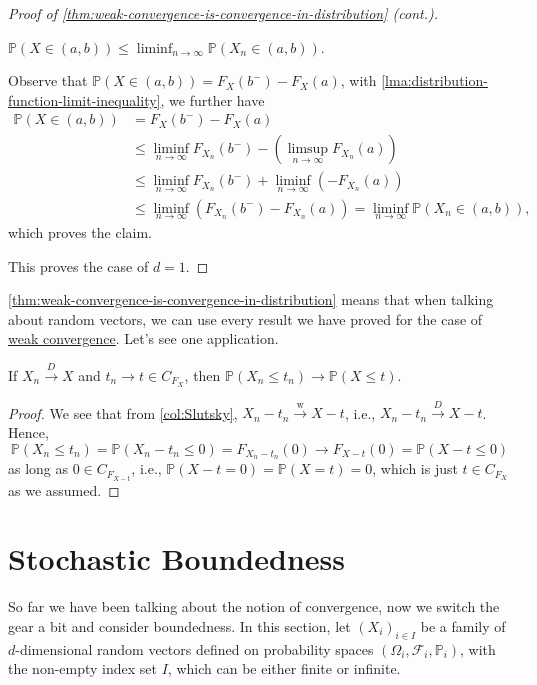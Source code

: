 \begin{proof}[Proof of \autoref{thm:weak-convergence-is-convergence-in-distribution} (cont.)]
	\begin{claim}
		\(\mathbb{P} (X \in (a, b)) \leq \liminf_{n \to \infty} \mathbb{P} (X_n \in (a, b))\).
	\end{claim}
	\begin{explanation}
		Observe that \(\mathbb{P} (X \in (a, b)) = F_X(b^-) - F_X(a)\), with \autoref{lma:distribution-function-limit-inequality}, we further have
		\[
			\begin{split}
				\mathbb{P} (X \in (a, b))
				 & = F_X(b^-) - F_X(a)                                                                         \\
				 & \leq \liminf_{n \to \infty} F_{X_n}(b^-) - \left( \limsup_{n \to \infty} F_{X_n}(a) \right) \\
				 & \leq \liminf_{n \to \infty} F_{X_n}(b^-) + \liminf_{n \to \infty} (-F_{X_n}(a))             \\
				 & \leq \liminf_{n \to \infty} \left( F_{X_n}(b^-) - F_{X_n}(a) \right)
				= \liminf_{n \to \infty} \mathbb{P} (X_n \in (a, b)),
			\end{split}
		\]
		which proves the claim.
	\end{explanation}
	This proves the case of \(d = 1\).
\end{proof}

\autoref{thm:weak-convergence-is-convergence-in-distribution} means that when talking about random vectors, we can use every result we have proved for the case of \hyperref[def:converge-weakly]{weak convergence}. Let's see one application.

\begin{proposition}
	If \(X_n \overset{D}{\to } X\) and \(t_n \to t \in C_{F_X}\), then \(\mathbb{P} (X_n \leq t_n) \to \mathbb{P} (X \leq t)\).
\end{proposition}
\begin{proof}
	We see that from \autoref{col:Slutsky}, \(X_n - t_n \overset{\text{w} }{\to } X - t\), i.e., \(X_n - t_n \overset{D}{\to } X - t\). Hence,
	\[
		\mathbb{P} (X_n \leq t_n)
		= \mathbb{P} (X_n - t_n \leq 0)
		= F_{X_n - t_n} (0)
		\to F_{X - t} (0)
		= \mathbb{P} (X - t \leq 0)
	\]
	as long as \(0 \in C_{F_{X - t}}\), i.e., \(\mathbb{P} (X - t = 0) = \mathbb{P} (X = t) = 0\), which is just \(t \in C_{F_X}\) as we assumed.
\end{proof}

\section{Stochastic Boundedness}
So far we have been talking about the notion of convergence, now we switch the gear a bit and consider boundedness. In this section, let \((X_i)_{i \in I}\) be a family of \(d\)-dimensional random vectors defined on probability spaces \((\Omega _i, \mathscr{F} _i, \mathbb{P} _i)\), with the non-empty index set \(I\), which can be either finite or infinite.

